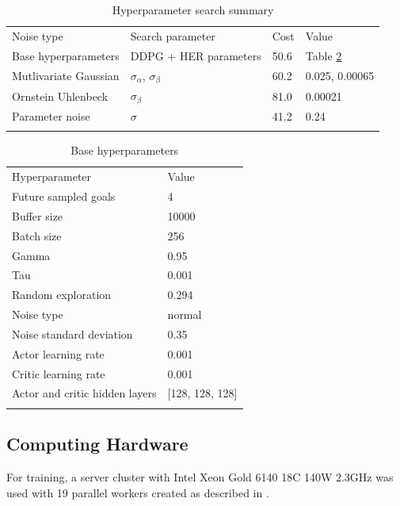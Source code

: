 \begin{table}
\centering
\begin{tabular}{llll}
\hline\noalign{\smallskip}
Noise type & Search parameter & Cost & Value \\
\noalign{\smallskip}\hline\noalign{\smallskip}
Base hyperparameters & DDPG + HER parameters & 50.6 & Table \ref{tab:base-hyperparams} \\
Mutlivariate Gaussian & $\sigma_\alpha$, $\sigma_\beta$ & 60.2 & 0.025, 0.00065 \\
Ornstein Uhlenbeck & $\sigma_\beta$ & 81.0 & 0.00021 \\
Parameter noise & $\sigma$ & 41.2 & 0.24 \\
\noalign{\smallskip}\hline
\end{tabular}
\caption{Hyperparameter search summary}
\label{tab:hyperparam-summary} 
\end{table}

\begin{table}
\centering
\begin{tabular}{ll}
\hline\noalign{\smallskip}
Hyperparameter  & Value \\
\noalign{\smallskip}\hline\noalign{\smallskip}
Future sampled goals & 4 \\
Buffer size & 10000 \\
Batch size & 256 \\
Gamma & 0.95 \\
Tau & 0.001 \\
Random exploration & 0.294 \\
Noise type & normal \\
Noise standard deviation & 0.35 \\
Actor learning rate & 0.001 \\
Critic learning rate & 0.001 \\
Actor and critic hidden layers & [128, 128, 128] \\
\noalign{\smallskip}\hline
\end{tabular}
\caption{Base hyperparameters}
\label{tab:base-hyperparams} 
\end{table}

\subsection{Computing Hardware}
For training, a server cluster with Intel Xeon Gold 6140 18C 140W 2.3GHz was used with 19 parallel workers created as described in \cite{OpenAI2018}.


